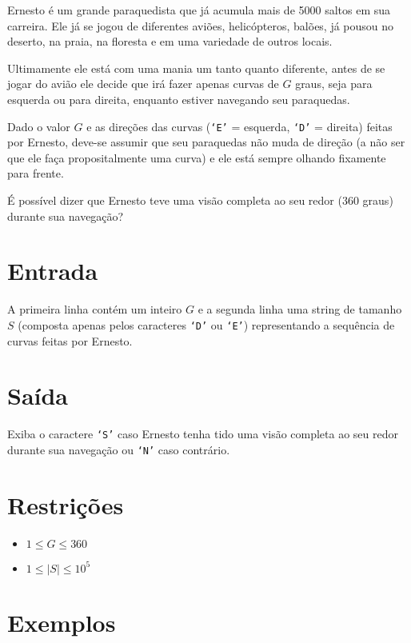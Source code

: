 Ernesto é um grande paraquedista que já acumula mais de 5000 saltos em sua carreira. Ele já se jogou de diferentes aviões, helicópteros, balões, já pousou no deserto, na praia, na floresta e em uma variedade de outros locais.

Ultimamente ele está com uma mania um tanto quanto diferente, antes de se jogar do avião ele decide que irá fazer apenas curvas de $G$ graus, seja para esquerda ou para direita, enquanto estiver navegando seu paraquedas.

Dado o valor $G$ e as direções das curvas (\texttt{`E'} = esquerda, \texttt{`D'} = direita) feitas por Ernesto, deve-se assumir que seu paraquedas não muda de direção (a não ser que ele faça propositalmente uma curva) e ele está sempre olhando fixamente para frente.

É possível dizer que Ernesto teve uma visão completa ao seu redor (360 graus) durante sua navegação?

\section*{Entrada}

A primeira linha contém um inteiro $G$ e a segunda linha uma string de tamanho $S$ (composta apenas pelos caracteres \texttt{`D'} ou \texttt{`E'}) representando a sequência de curvas feitas por Ernesto.

\section*{Saída}

Exiba o caractere \texttt{`S'} caso Ernesto tenha tido uma visão completa ao seu redor durante sua navegação ou \texttt{`N'} caso contrário.

\section*{Restrições}

\begin{itemize}
\item $1 \leq G \leq 360$
\item $1 \leq |S| \leq 10^5$
\end{itemize}

\section*{Exemplos}

\exemplo
